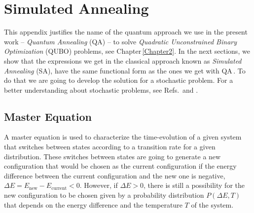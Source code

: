 
\chapter{Simulated Annealing} %

This appendix justifies the name of the quantum approach we use in the present work -- \textit{Quantum Annealing} (QA) -- to solve \textit{Quadratic Unconstrained Binary Optimization} (QUBO) problems, see Chapter\,\ref{Chapter2}. In the next sections, we show that the expressions we get in the classical approach known as \textit{Simulated Annealing} (SA), have the same functional form as the ones we get with QA\,\cite{Kadowaki1998QuantumModel}. To do that we are going to develop the solution for a stochastic problem. For a better understanding about stochastic problems, see Refs.\,\cite{Schneider2006StochasticOptimization} and \cite{AlvaroDiazComputacionAdiabatica}. 
\label{AppendixB} %
\section{Master Equation}
A master equation is used to characterize the time-evolution of a given system that switches between states according to a transition rate for a given distribution. These switches between states are going to generate a new configuration that would be chosen as the current configuration if the energy difference between the current configuration and the new one is negative, $\Delta E = E_{\text{new}} - E_{\text{current}} < 0$. However, if $\Delta E > 0$, there is still a possibility for the new configuration to be chosen given by a probability distribution $P \left(\Delta E, T \right)$ that depends on the energy difference and the temperature $T$ of the system.
